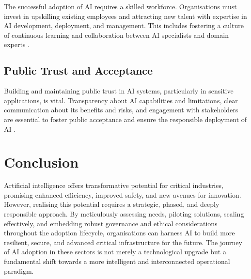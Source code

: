 The successful adoption of AI requires a skilled workforce. Organisations must invest in upskilling existing employees and attracting new talent with expertise in AI development, deployment, and management. This includes fostering a culture of continuous learning and collaboration between AI specialists and domain experts \parencite{dhs2024roles}.

\subsection{Public Trust and Acceptance}

Building and maintaining public trust in AI systems, particularly in sensitive applications, is vital. Transparency about AI capabilities and limitations, clear communication about its benefits and risks, and engagement with stakeholders are essential to foster public acceptance and ensure the responsible deployment of AI \parencite{leyliabadi2025conceptual}.

\section{Conclusion}

Artificial intelligence offers transformative potential for critical industries, promising enhanced efficiency, improved safety, and new avenues for innovation. However, realising this potential requires a strategic, phased, and deeply responsible approach. By meticulously assessing needs, piloting solutions, scaling effectively, and embedding robust governance and ethical considerations throughout the adoption lifecycle, organisations can harness AI to build more resilient, secure, and advanced critical infrastructure for the future. The journey of AI adoption in these sectors is not merely a technological upgrade but a fundamental shift towards a more intelligent and interconnected operational paradigm.
